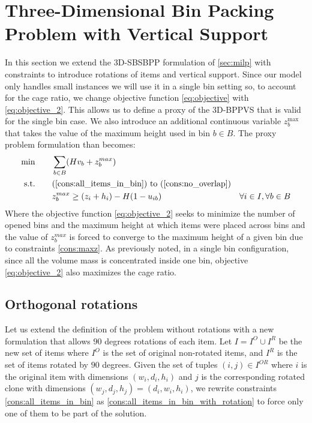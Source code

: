 \section{Three-Dimensional Bin Packing Problem with Vertical Support}
In this section we extend the 3D-SBSBPP formulation of \cref{sec:milp} with constraints to introduce rotations of items and vertical support. Since our model only handles small instances we will use it in a single bin setting so, to account for the cage ratio, we change objective function \ref{eq:objective} with \ref{eq:objective_2}.
This allows us to define a proxy of the 3D-BPPVS that is valid for the single bin case.
We also introduce an additional continuous variable $z_b^\text{max}$ that takes the value of the maximum height used in bin $b \in B$.
The proxy problem formulation than becomes:
\begin{align}
    \min       \qquad& \sum\limits_{b \in B} (H v_b + z^{max}_b) & \label{eq:objective_2} \\
    \text{s.t.} \qquad& \text{(\ref{cons:all_items_in_bin}) to (\ref{cons:no_overlap})} \notag \\ 
                     & z^{max}_b \ge (z_i + h_i) - H(1-u_{ib}) & \forall i \in I, \forall b \in B \label{cons:maxz}
\end{align}
Where the objective function \ref{eq:objective_2} seeks to minimize the number of opened bins and the maximum height at which items were placed across bins and the value of $z^{max}_b$ is forced to converge to the maximum height of a given bin due to constraints \ref{cons:maxz}.
As previously noted, in a single bin configuration, since all the volume mass is concentrated inside one bin, objective \ref{eq:objective_2} also maximizes the cage ratio.
\subsection*{Orthogonal rotations}
\label{subsec:orthogonal_rotations}%

Let us extend the definition of the problem without rotations with a new formulation that allows $90$ degrees rotations of each item.
Let $I = I^O \cup I^R$ be the new set of items where $I^O$ is the set of original non-rotated items, and $I^R$ is the set of items rotated by $90$ degrees.
Given the set of tuples $(i, j) \in I^{OR}$ where $i$ is the original item with dimensions $(w_i, d_i, h_i)$ and $j$ is the corresponding rotated clone with dimensions $(w_j, d_j, h_j) = (d_i, w_i, h_i)$, we rewrite constraints \ref{cons:all_items_in_bin} as \ref{cons:all_items_in_bin_with_rotation} to force only one of them to be part of the solution.

